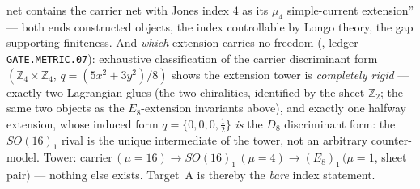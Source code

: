 \documentclass[11pt,a4paper]{article}
\begin{document}
\begin{winbox}
net contains the carrier net with Jones index $4$ as its $\mu_4$ simple-current extension'' --- both ends
constructed objects, the index controllable by Longo theory, the gap supporting finiteness. And \emph{which}
extension carries no freedom (, ledger \texttt{GATE.METRIC.07}): exhaustive
classification of the carrier discriminant form $(\mathbb Z_4{\times}\mathbb Z_4,\,q{=}(5x^2{+}3y^2)/8)$ shows the
extension tower is \emph{completely rigid} --- exactly two Lagrangian glues (the two chiralities, identified
by the sheet $\mathbb Z_2$; the same two objects as the $E_8$-extension invariants above), and exactly one halfway
extension, whose induced form $q=\{0,0,0,\tfrac12\}$ \emph{is} the $D_8$ discriminant form: the $SO(16)_1$
rival is the unique intermediate of the tower, not an arbitrary counter-model. Tower:
carrier\,$(\mu{=}16)\to SO(16)_1\,(\mu{=}4)\to(E_8)_1\,(\mu{=}1$, sheet pair$)$ --- nothing else exists.
Target~A is thereby the \emph{bare} index statement.


\end{winbox}
\end{document}

